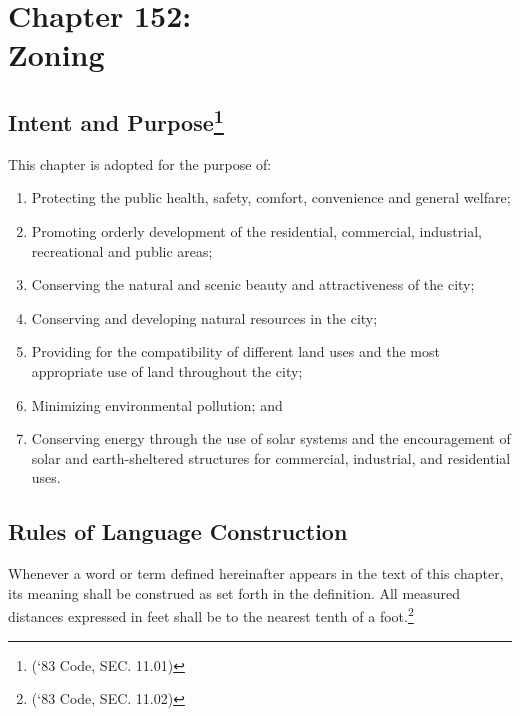 \chapter*{Chapter 152: \\
	Zoning}
    \vfill
    \minitoc
    \pagebreak


\section{Intent and Purpose\footnote{(‘83 Code, SEC. 11.01)}}
This chapter is adopted for the purpose of:
\begin{enumerate}[{\indent}A)]
    \item Protecting the public health, safety, comfort, convenience and general welfare; 
    \item Promoting orderly development of the residential, commercial, industrial, recreational and public areas; 
    \item Conserving the natural and scenic beauty and attractiveness of the city; 
    \item Conserving and developing natural resources in the city; 
    \item Providing for the compatibility of different land uses and the most appropriate use of land throughout the city; 
    \item Minimizing environmental pollution; and
    \item Conserving energy through the use of solar systems and the encouragement of solar and earth-sheltered structures for commercial, industrial, and residential uses.
\end{enumerate}

\section{Rules of Language Construction}
Whenever a word or term defined hereinafter appears in the text of this chapter, its meaning shall be construed as set forth in the definition. All measured distances expressed in feet shall be to the nearest tenth of a foot.\footnote{(‘83 Code, SEC. 11.02)}

